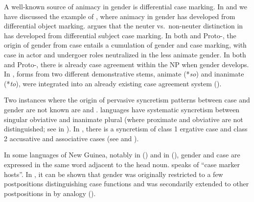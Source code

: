 \documentclass[output=collectionpaper]{langsci/langscibook}
\begin{document}
\largerpage
A well-known source of animacy in gender is differential case marking. In  and  we have discussed the example of , where animacy in gender has developed from differential object marking. \cite[456]{Luraghi2011} argues that the neuter vs.\ non-neuter distinction in  has developed from differential subject case marking. In both  and Proto-, the origin of gender from case entails a cumulation of gender and case marking, with case in actor and undergoer roles neutralized in the less animate gender. In both  and Proto-, there is already case agreement within the NP when gender develops. In , forms from two different demonstrative stems, animate (*\textit{so}) and inanimate (*\textit{to}), were integrated into an already existing case agreement system (\citealt[456]{Luraghi2011}).

Two instances where the origin of pervasive syncretism patterns between case and gender are not known are  and .  languages have systematic syncretism between singular obviative and inanimate plural (where proximate and obviative are not distinguished; see  in ). In , there is a syncretism of class 1 ergative case and class 2 accusative and associative cases (see  and ).

In some languages of New Guinea, notably in  () and in  (), gender and case are expressed in the same word adjacent to the head noun.  speaks of ``case marker hosts''. In , it can be shown that gender was originally restricted to a few postpositions distinguishing case functions and was secondarily extended to other postpositions in  by analogy (\citealt{Waelchli2018}).
\end{document}
